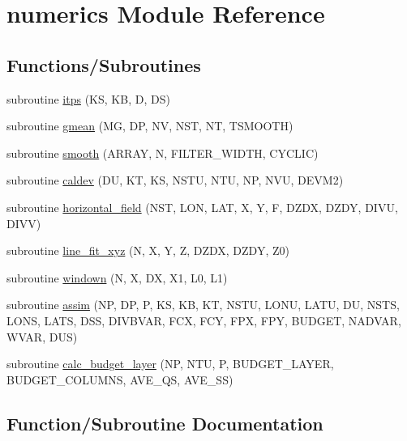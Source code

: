 \hypertarget{namespacenumerics}{}\section{numerics Module Reference}
\label{namespacenumerics}
\subsection*{Functions/\+Subroutines}
\begin{DoxyCompactItemize}
\item 
subroutine \hyperlink{namespacenumerics_ac972e0e69239cba641ad373fee101472}{itps} (KS, KB, D, DS)
\item 
subroutine \hyperlink{namespacenumerics_afbd04035bb50e63d44980bf39cf84ac3}{gmean} (MG, DP, NV, N\+ST, NT, T\+S\+M\+O\+O\+TH)
\item 
subroutine \hyperlink{namespacenumerics_a354d8c793bd1515de7af7cfa32c51389}{smooth} (A\+R\+R\+AY, N, F\+I\+L\+T\+E\+R\+\_\+\+W\+I\+D\+TH, C\+Y\+C\+L\+IC)
\item 
subroutine \hyperlink{namespacenumerics_add44a47f4f996c0266711b825fd6bb20}{caldev} (DU, KT, KS, N\+S\+TU, N\+TU, NP, N\+VU, D\+E\+V\+M2)
\item 
subroutine \hyperlink{namespacenumerics_a9581a41d0b81a5ded9690972e499c629}{horizontal\+\_\+field} (N\+ST, L\+ON, L\+AT, X, Y, F, D\+Z\+DX, D\+Z\+DY, D\+I\+VU, D\+I\+VV)
\item 
subroutine \hyperlink{namespacenumerics_a8e58d8bf1c738af1a91517fdb8b81aa2}{line\+\_\+fit\+\_\+xyz} (N, X, Y, Z, D\+Z\+DX, D\+Z\+DY, Z0)
\item 
subroutine \hyperlink{namespacenumerics_aa16b459eac85058fd1da1b9ebc4555b9}{windown} (N, X, DX, X1, L0, L1)
\item 
subroutine \hyperlink{namespacenumerics_acc1dd6ef9a4cf200fd7701143c4ae29e}{assim} (NP, DP, P, KS, KB, KT, N\+S\+TU, L\+O\+NU, L\+A\+TU, DU, N\+S\+TS, L\+O\+NS, L\+A\+TS, D\+SS, D\+I\+V\+B\+V\+AR, F\+CX, F\+CY, F\+PX, F\+PY, B\+U\+D\+G\+ET, N\+A\+D\+V\+AR, W\+V\+AR, D\+US)
\item 
subroutine \hyperlink{namespacenumerics_adbe2d748ef22c981cddde813d1db9d77}{calc\+\_\+budget\+\_\+layer} (NP, N\+TU, P, B\+U\+D\+G\+E\+T\+\_\+\+L\+A\+Y\+ER, B\+U\+D\+G\+E\+T\+\_\+\+C\+O\+L\+U\+M\+NS, A\+V\+E\+\_\+\+QS, A\+V\+E\+\_\+\+SS)
\end{DoxyCompactItemize}


\subsection{Function/\+Subroutine Documentation}
